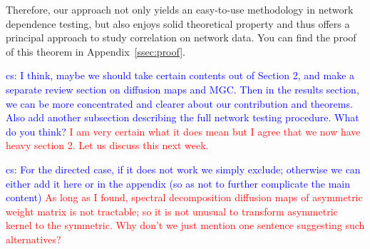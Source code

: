 \documentclass[11pt]{article}
\theoremstyle{definition}
\newcommand{\cs}[1]{\textcolor{blue}{cs: #1}}
\begin{document}
Therefore, our approach not only yields an easy-to-use methodology in network dependence testing, but also enjoys solid theoretical property and thus offers a principal approach to study correlation on network data. You can find the proof of this theorem in Appendix~\ref{ssec:proof}.

\cs{I think, maybe we should take certain contents out of Section 2, and make a separate review section on diffusion maps and MGC. Then in the results section, we can be more concentrated and clearer about our contribution and theorems. Also add another subsection describing the full network testing procedure. What do you think?}
\textcolor{red}{I am very certain what it does mean but I agree that we now have heavy section 2. Let us discuss this next week.}

\cs{For the directed case, if it does not work we simply exclude; otherwise we can either add it here or in the appendix (so as not to further complicate the main content)}
\textcolor{red}{As long as I found, spectral decomposition diffusion maps of asymmetric weight matrix is not tractable; so it is not unusual to transform asymmetric kernel to the symmetric. Why don't we just mention one sentence suggesting such alternatives?  }

\end{document}
